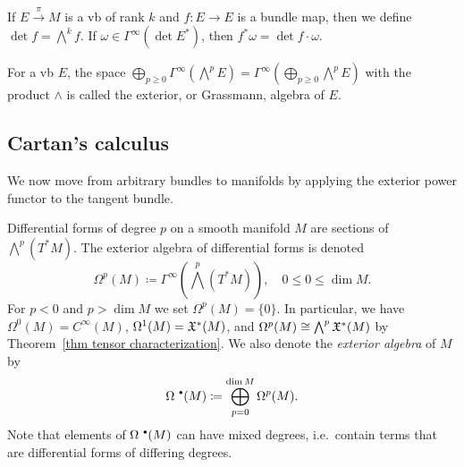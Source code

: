 \begin{defn}
If $E\overset\pi\to M$ is a \gls{vb} of rank $k$ and $f:E\to E$ is a bundle map, then we define $\det f=\bigwedge^k f$. If $\omega\in\Gamma^\infty(\det E^\ast)$, then $f^\ast \omega=\det f\cdot \omega$.
\end{defn}

\begin{defn}
For a \gls{vb} $E$, the space $\bigoplus_{p\geq 0}\Gamma^\infty(\bigwedge^p E)=\Gamma^\infty\left(\bigoplus_{p\geq 0}\bigwedge^p E\right)$ with the product $\wedge$ is called the exterior, or Grassmann, algebra of $E$.
\end{defn}







\subsection{Cartan's calculus}

We now move from arbitrary bundles to manifolds by applying the exterior power functor to the tangent bundle.

\begin{defn}
    Differential forms of degree $p$ on a smooth manifold $M$ are sections of $\bigwedge^p (T^\ast M)$. The exterior algebra of differential forms is denoted
    \[\Omega^p(M)\coloneqq \Gamma^\infty\left(\bigwedge^p(T^\ast M)\right),\quad 0\leq 0\leq\dim M.\]
    For $p<0$ and $p>\dim M$ we set $\Omega^p(M)=\{0\}$.
    In particular, we have $\Omega^0(M)=C^\infty(M)$, $\Omega^1(M)=\mathfrak{X}^\ast (M)$, and $\Omega^p(M)\cong \bigwedge^p \mathfrak{X}^\ast(M)$ by Theorem~\ref{thm tensor characterization}. We also denote the \emph{exterior algebra} of $M$ by
    \[\Omega^{\smbullet}(M)\coloneq\bigoplus_{p=0}^{\dim M} \Omega^p(M).\]
    Note that elements of $\Omega^{\smbullet}(M)$ can have mixed degrees, i.e.\ contain terms that are differential forms of differing degrees.
\end{defn}


